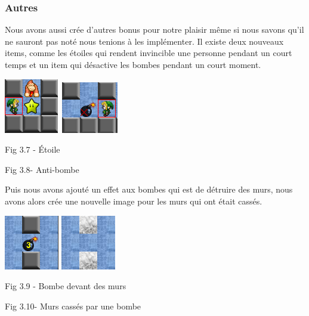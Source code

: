 \documentclass[12pt]{article}
\begin{document}
            \subsubsection{Autres}
            Nous avons aussi crée d'autres bonus pour notre plaisir même si nous savons qu'il ne sauront pas noté nous tenions à les implémenter. Il existe deux nouveaux items, comme les étoiles qui rendent invincible une personne pendant un court temps et un item qui désactive les bombes pendant un court moment.
            \begin{center}
                \includegraphics[scale=1]{etoile.png}
                \includegraphics[scale=1]{disarm.png}
            \end{center}
            \begin{center}
                \caption{Fig 3.7 - Étoile}
                \caption{Fig 3.8- Anti-bombe}
            \end{center}
            Puis nous avons ajouté un effet aux bombes qui est de détruire des murs, nous avons alors crée une nouvelle image pour les murs qui ont était cassés.
            \begin{center}
                \includegraphics[scale=1]{post_break.png}
                \includegraphics[scale=1]{break.png}
            \end{center}
            \begin{center}
                \caption{Fig 3.9 - Bombe devant des murs}
                \caption{Fig 3.10- Murs cassés par une bombe}
            \end{center}
\end{document}
